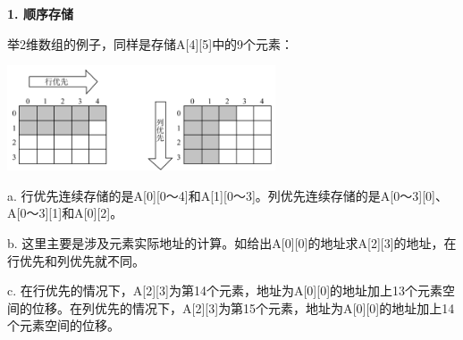 {\textbf{1. 顺序存储}}

举2维数组的例子，同样是存储A{[}4{]}{[}5{]}中的9个元素：

\includegraphics[width=3.12500in,height=1.22917in]{png-jpeg-pics/8C488ABCE9077951EA00275DDE50F718.png}

{a.
行优先连续存储的是A{[}0{]}{[}0～4{]}和A{[}1{]}{[}0～3{]}。}{列优先连续存储的是A{[}0～3{]}{[}0{]}、A{[}0～3{]}{[}1{]}和A{[}0{]}{[}2{]}。}

{b.
这里主要是涉及元素实际地址的计算。如给出A{[}0{]}{[}0{]}的地址求A{[}2{]}{[}3{]}的地址，在行优先和列优先就不同。}

{c.
在行优先的情况下，A{[}2{]}{[}3{]}为第14个元素，地址为A{[}0{]}{[}0{]}的地址加上13个元素空间的位移。}{在列优先的情况下，A{[}2{]}{[}3{]}为第15个元素，地址为A{[}0{]}{[}0{]}的地址加上14个元素空间的位移。}
